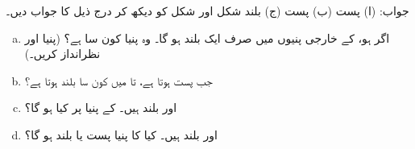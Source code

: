   جواب: (ا) پست (ب) پست (ج) بلند
 شکل   اور  شکل   کو دیکھ کر درج ذیل کا جواب دیں۔
 \begin{enumerate}[a.]
 \item
 اگر  ہو،  کے خارجی پنیوں میں صرف ایک بلند ہو گا۔ وہ پنیا کون سا ہے؟ (پنیا  اور    نظرانداز کریں۔)
 \item
 جب  پست ہوتا ہے،  تا  میں  کون سا بلند ہوتا ہے؟
 \item
{}اور  بلند ہیں۔  کے پنیا  پر کیا ہو گا؟
\item
{} اور   بلند ہیں۔ کیا  کا  پنیا  پست یا بلند ہو گا؟
 \end{enumerate}

